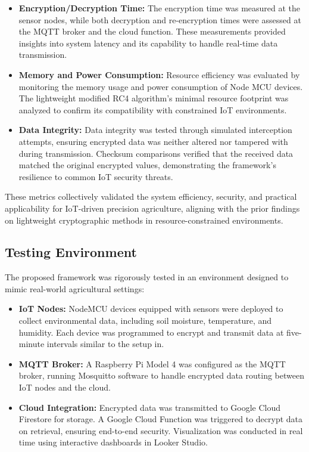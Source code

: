 \documentclass[runningheads]{llncs}
\begin{document}
\begin{itemize}
    \item \textbf{Encryption/Decryption Time:} The encryption time was measured at the sensor nodes, while both decryption and re-encryption times were assessed at the MQTT broker and the cloud function. These measurements provided insights into system latency and its capability to handle real-time data transmission.
    \item \textbf{Memory and Power Consumption:} Resource efficiency was evaluated by monitoring the memory usage and power consumption of Node MCU devices. The lightweight modified RC4 algorithm's minimal resource footprint was analyzed to confirm its compatibility with constrained IoT environments.
    \item \textbf{Data Integrity:} Data integrity was tested through simulated interception attempts, ensuring encrypted data was neither altered nor tampered with during transmission. Checksum comparisons verified that the received data matched the original encrypted values, demonstrating the framework's resilience to common IoT security threats.
\end{itemize}

These metrics collectively validated the system efficiency, security, and practical applicability for IoT-driven precision agriculture, aligning with the prior findings on lightweight cryptographic methods in resource-constrained environments.

\subsection{Testing Environment}

The proposed framework was rigorously tested in an environment designed to mimic real-world agricultural settings:

\begin{itemize}
    \item \textbf{IoT Nodes:} NodeMCU devices equipped with sensors were deployed to collect environmental data, including soil moisture, temperature, and humidity. Each device was programmed to encrypt and transmit data at five-minute intervals similar to the setup in\cite{ref10,ref15}.
    \item \textbf{MQTT Broker:} A Raspberry Pi Model 4 was configured as the MQTT broker, running Mosquitto software to handle encrypted data routing between IoT nodes and the cloud.
    \item \textbf{Cloud Integration:} Encrypted data was transmitted to Google Cloud Firestore for storage. A Google Cloud Function was triggered to decrypt data on retrieval, ensuring end-to-end security. Visualization was conducted in real time using interactive dashboards in Looker Studio.
\end{itemize}
\end{document}
